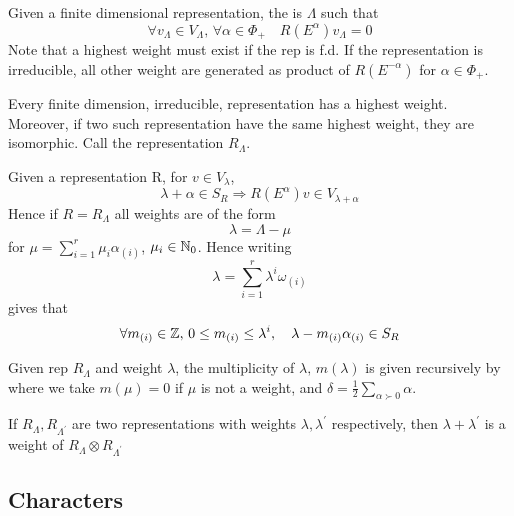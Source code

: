 \documentclass{article}
\begin{document}
\begin{definition}
	Given a finite dimensional representation, the  is $\Lambda$ such that 
	\[
	\forall v_\Lambda\in V_\Lambda, \, \forall \alpha\in\Phi_+ \quad R(E^\alpha)v_\Lambda=0
	\]
	Note that a highest weight must exist if the rep is f.d. If the representation is irreducible, all other weight are generated as product of $R(E^{-\alpha})$ for $\alpha\in\Phi_+$. 
\end{definition}

\begin{theorem}
	Every finite dimension, irreducible, representation has a highest weight. Moreover, if two such representation have the same highest weight, they are isomorphic. Call the representation $R_\Lambda$. 
\end{theorem}

\begin{fact}
	Given a representation R, for $v\in V_\lambda$, 
	\[
	\lambda+\alpha\in S_R \Rightarrow R(E^\alpha)v \in V_{\lambda+\alpha}
	\]
	Hence if $R=R_\Lambda$ all weights are of the form 
	\[
	\lambda=\Lambda-\mu
	\]
	for $\mu=\sum_{i=1}^r \mu_i \alpha_{(i)}$, $\mu_i\in\mathbb{N}_0$. Hence writing 
	\[
	\lambda=\sum_{i=1}^r \lambda^i \omega_{(i)}
	\]
	gives that
	\[
	\forall m_{(i)}\in\mathbb{Z}, \, 0\leq m_{(i)}\leq \lambda^i, \quad \lambda-m_{(i)}\alpha_{(i)}\in S_R
	\]
\end{fact}

\begin{theorem}
	Given rep $R_\Lambda$ and weight $\lambda$, the multiplicity of $\lambda, \, m(\lambda)$ is given recursively by 
where we take $m(\mu)=0$ if $\mu$ is not a weight, and $\delta = \frac{1}{2} \sum_{\alpha \succ 0} \alpha$. 
\end{theorem}

\begin{lemma}
	If $R_\Lambda, R_{\Lambda^\prime}$ are two representations with weights $\lambda,\lambda^\prime$ respectively, then $\lambda+\lambda^\prime$ is a weight of $R_\Lambda \otimes R_{\Lambda^\prime}$
\end{lemma}

\subsection{Characters}
\end{document}

